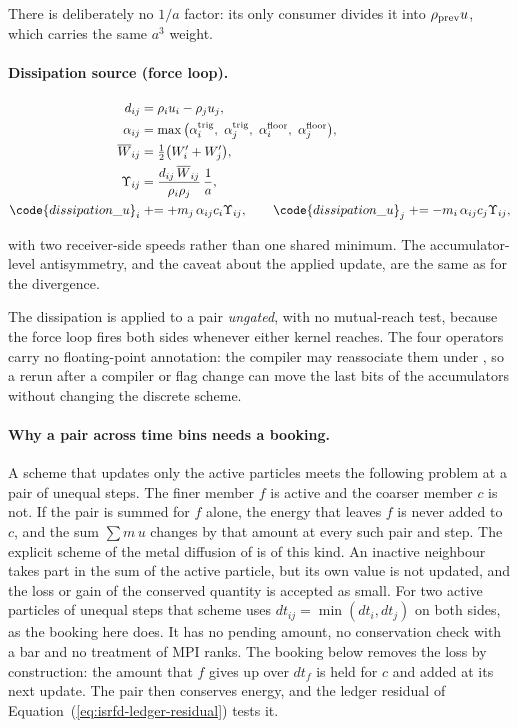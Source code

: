 There is deliberately no $1/a$ factor: its only consumer divides it into
$\rho_{\rm prev} u$, which carries the same $a^3$ weight.

\paragraph{Dissipation source (force loop).}

\begin{align}
  d_{ij} &= \rho_i u_i - \rho_j u_j,
  \label{eq:isrfd-diss-d} \\
  \alpha_{ij} &= \max\big(\alpha^{\rm trig}_i,\ \alpha^{\rm trig}_j,\
    \alpha^{\rm floor}_i,\ \alpha^{\rm floor}_j\big),
  \label{eq:isrfd-diss-alpha} \\
  \overline{W}_{ij} &= \tfrac{1}{2}\big(W'_i + W'_j\big),
  \label{eq:isrfd-diss-wbar} \\
  \Upsilon_{ij} &= \frac{d_{ij}\,\overline{W}_{ij}}{\rho_i \rho_j}\,\frac{1}{a},
  \label{eq:isrfd-diss-shape} \\
  \code{dissipation\_u}_i &\mathrel{+}= + m_j\, \alpha_{ij} c_i \Upsilon_{ij},
  \qquad
  \code{dissipation\_u}_j \mathrel{+}= - m_i\, \alpha_{ij} c_j \Upsilon_{ij},
  \label{eq:isrfd-diss-apply}
\end{align}

with two receiver-side speeds rather than one
shared minimum. The accumulator-level antisymmetry, and the caveat about the
applied update, are the same as for the divergence.

The dissipation is applied to a pair \emph{ungated}, with no mutual-reach test,
because the force loop fires both sides whenever either kernel reaches. The four
operators carry no
floating-point annotation: the compiler may reassociate them under
\code{-ffast-math}, so a rerun after a compiler or flag change can move the last
bits of the accumulators without changing the discrete scheme.

\paragraph{Why a pair across time bins needs a booking.} A scheme that
updates only the active particles meets the following problem at a pair of
unequal steps. The finer member $f$ is active and the coarser member $c$ is
not. If the pair is summed for $f$ alone, the energy that leaves $f$ is never
added to $c$, and the sum $\sum m\,u$ changes by that amount at every such
pair and step. The explicit scheme of the metal diffusion of
\citet[Appendix~C]{Correa2026} is of this kind. An inactive neighbour takes
part in the sum of the active particle, but its own value is not updated, and
the loss or gain of the conserved quantity is accepted as small. For two
active particles of unequal steps that scheme uses
$dt_{ij} = \min(dt_i, dt_j)$ on both sides, as the booking here does. It has no
pending amount, no conservation check with a bar and no treatment of MPI ranks.
The booking below removes the loss by construction: the amount that $f$ gives
up over $dt_f$ is held for $c$ and added at its next update. The pair then
conserves energy, and the ledger residual of
Equation~(\ref{eq:isrfd-ledger-residual}) tests it.

